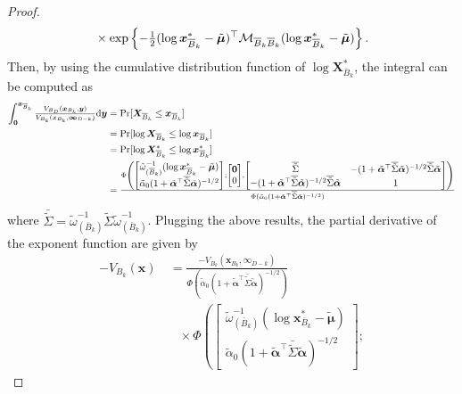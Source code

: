 \documentclass[12pt]{article}
\begin{document}
\begin{proof}
\begin{align*}
&\quad \times \exp\left\{-{\textstyle{1\over2}} (\log \bm x_{{\overline{B}}_k}^{*}-\tilde{\bm\mu})^\top {\mathcal M}_{{\overline{B}}_k {\overline{B}}_k} (\log \bm x_{{\overline{B}}_k}^{*}-\tilde{\bm\mu})\right\}. 
\end{align*}
Then, by using the cumulative distribution function of $\log\bm X_{\bar B_k}^{*}$, the integral can be computed as
\begin{align*}
   \int_{\bm 0}^{\bm x_{{\overline{B}}_k}}{\textstyle{V_{B_D}(\bm x_{B_k},\bm y)\over V_{B_k}(x_{B_k},\bm\infty_{D-k})}} \text d \bm y 
   &= {\rm Pr}[\bm X_{{\overline{B}}_k} \leq \bm x_{{\overline{B}}_k}] \\
& = {\rm Pr}[\log\bm X_{{\overline{B}}_k} \leq \log\bm x_{{\overline{B}}_k}]\\
& = {\rm Pr}[\log\bm X_{{\overline{B}}_k}^{*} \leq \log\bm x_{{\overline{B}}_k}^{*}] \\
& =  {\textstyle{\Phi\left(
\begin{bmatrix} \tilde\omega^{-1}_{({\overline{B}}_k)}(\log \bm x_{{\overline{B}}_k}^{*} - \tilde{\bm\mu})  \\\tilde\alpha_0(1+\tilde{\bm\alpha}^\top{\overline{\tilde\Sigma}}\tilde{\bm\alpha})^{-1/2}
\end{bmatrix};
\begin{bmatrix}
\bm 0 \\ 0
\end{bmatrix},
\begin{bmatrix}
	{\overline{\tilde\Sigma}} & -(1+\tilde{\bm\alpha}^\top{\overline{\tilde\Sigma}}\tilde{\bm\alpha})^{-1/2}{\overline{\tilde\Sigma}}\tilde{\bm\alpha} \\
-(1+\tilde{\bm\alpha}^\top{\overline{\tilde\Sigma}}\tilde{\bm\alpha})^{-1/2}{\overline{\tilde\Sigma}}\tilde{\bm\alpha} &	1
\end{bmatrix} 
\right)\over\Phi(\tilde\alpha_0(1+\tilde{\bm\alpha}^\top{\overline{\tilde\Sigma}}\tilde{\bm\alpha})^{-1/2})}}   
\end{align*}
where $\bar{\tilde\Sigma} = \tilde\omega_{(\bar B_k)}^{-1}\tilde\Sigma\tilde\omega_{(\bar B_k)}^{-1}$. 
Plugging the above results, the partial derivative of the exponent function are given by
\begin{align*}
   -V_{B_k}(\bm x) &\ =  
   \frac{-V_{B_k}(\bm x_{B_k},\bm \infty_{D-k})}{\Phi(\tilde\alpha_0(1+\tilde{\bm\alpha}^\top\bar{\tilde\Sigma}\tilde{\bm\alpha})^{-1/2})} \\
   & \quad \times
   \Phi\left(
   \begin{bmatrix} \tilde\omega^{-1}_{(\bar B_k)}(\log \bm x_{\bar B_k}^{*} - \tilde{\bm\mu})  \\
\tilde\alpha_0(1+\tilde{\bm\alpha}^\top\bar{\tilde\Sigma}\tilde{\bm\alpha})^{-1/2}
    \end{bmatrix};

\end{align*}
\end{proof}
\end{document}
